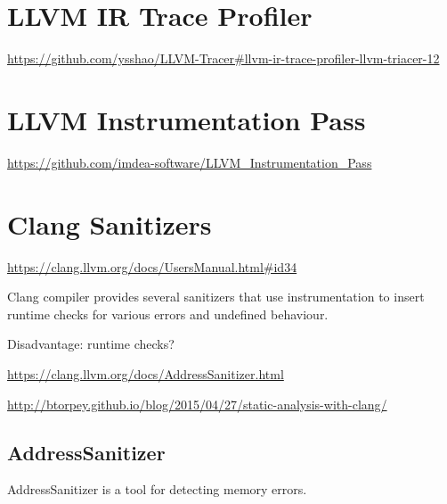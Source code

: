 \section{LLVM IR Trace Profiler}

\url{https://github.com/ysshao/LLVM-Tracer#llvm-ir-trace-profiler-llvm-triacer-12}

\section{LLVM Instrumentation Pass}

\url{https://github.com/imdea-software/LLVM\_Instrumentation\_Pass}

\section{Clang Sanitizers}

\url{https://clang.llvm.org/docs/UsersManual.html#id34}
\medskip

Clang compiler provides several sanitizers that use instrumentation to insert runtime checks for various errors and undefined behaviour.

Disadvantage: runtime checks?

\bigskip

\url{https://clang.llvm.org/docs/AddressSanitizer.html}

\url{http://btorpey.github.io/blog/2015/04/27/static-analysis-with-clang/}
\medskip

\subsection{AddressSanitizer}
AddressSanitizer is a tool for detecting memory errors.
